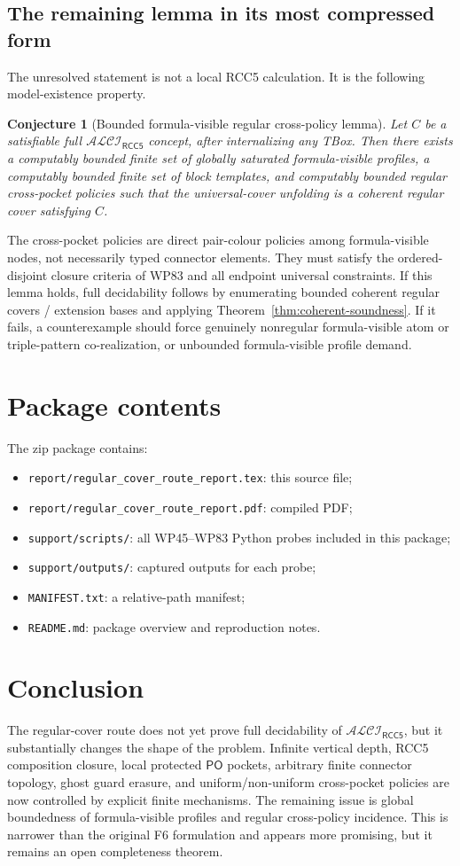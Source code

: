 \documentclass[11pt]{article}
\newtheorem{conjecture}[theorem]{Conjecture}
\newcommand{\PO}{\mathsf{PO}}
\newcommand{\ALCI}{\mathcal{ALCI}_{\mathsf{RCC5}}}
\begin{document}
\subsection{The remaining lemma in its most compressed form}
The unresolved statement is not a local RCC5 calculation.  It is the following model-existence property.

\begin{conjecture}[Bounded formula-visible regular cross-policy lemma]
Let $C$ be a satisfiable full $\ALCI$ concept, after internalizing any TBox.  Then there exists a computably bounded finite set of globally saturated formula-visible profiles, a computably bounded finite set of block templates, and computably bounded regular cross-pocket policies such that the universal-cover unfolding is a coherent regular cover satisfying $C$.
\end{conjecture}

The cross-pocket policies are direct pair-colour policies among formula-visible nodes, not necessarily typed connector elements.  They must satisfy the ordered-disjoint closure criteria of WP83 and all endpoint universal constraints.  If this lemma holds, full decidability follows by enumerating bounded coherent regular covers / extension bases and applying Theorem~\ref{thm:coherent-soundness}.  If it fails, a counterexample should force genuinely nonregular formula-visible atom or triple-pattern co-realization, or unbounded formula-visible profile demand.

\section{Package contents}
The zip package contains:
\begin{itemize}
\item \texttt{report/regular\_cover\_route\_report.tex}: this source file;
\item \texttt{report/regular\_cover\_route\_report.pdf}: compiled PDF;
\item \texttt{support/scripts/}: all WP45--WP83 Python probes included in this package;
\item \texttt{support/outputs/}: captured outputs for each probe;
\item \texttt{MANIFEST.txt}: a relative-path manifest;
\item \texttt{README.md}: package overview and reproduction notes.
\end{itemize}


\section{Conclusion}
The regular-cover route does not yet prove full decidability of $\ALCI$, but it substantially changes the shape of the problem.  Infinite vertical depth, RCC5 composition closure, local protected $\PO$ pockets, arbitrary finite connector topology, ghost guard erasure, and uniform/non-uniform cross-pocket policies are now controlled by explicit finite mechanisms.  The remaining issue is global boundedness of formula-visible profiles and regular cross-policy incidence.  This is narrower than the original F6 formulation and appears more promising, but it remains an open completeness theorem.
\end{document}
